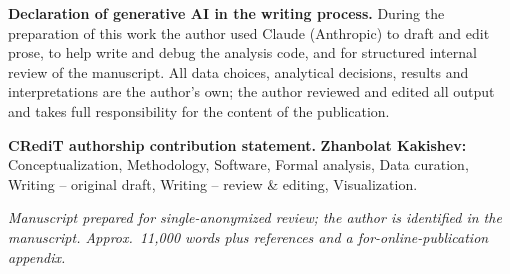 \documentclass[12pt]{article}
\begin{document}
\vspace{0.8em}
\noindent\textbf{Declaration of generative AI in the writing process.}
During the preparation of this work the author used Claude (Anthropic) to draft and edit
prose, to help write and debug the analysis code, and for structured internal review of the
manuscript. All data choices, analytical decisions, results and interpretations are the
author's own; the author reviewed and edited all output and takes full responsibility for the
content of the publication.

\vspace{0.8em}
\noindent\textbf{CRediT authorship contribution statement.}
\textbf{Zhanbolat Kakishev:} Conceptualization, Methodology, Software, Formal analysis, Data
curation, Writing -- original draft, Writing -- review \& editing, Visualization.

\vspace{1.5em}
\noindent\textit{Manuscript prepared for single-anonymized review; the author is identified in
the manuscript. Approx.\ 11{,}000 words plus references and a for-online-publication appendix.}
\end{document}
